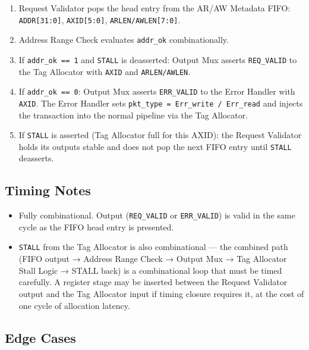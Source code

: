 \begin{enumerate}
  \item Request Validator pops the head entry from the AR/AW Metadata
        FIFO: \texttt{ADDR[31:0]}, \texttt{AXID[5:0]},
        \texttt{ARLEN/AWLEN[7:0]}.
  \item Address Range Check evaluates \texttt{addr\_ok} combinationally.
  \item If \texttt{addr\_ok == 1} and \texttt{STALL} is deasserted:
        Output Mux asserts \texttt{REQ\_VALID} to the Tag Allocator
        with \texttt{AXID} and \texttt{ARLEN/AWLEN}.
  \item If \texttt{addr\_ok == 0}: Output Mux asserts \texttt{ERR\_VALID}
        to the Error Handler with \texttt{AXID}. The Error Handler sets
        \texttt{pkt\_type = Err\_write / Err\_read} and injects the
        transaction into the normal pipeline via the Tag Allocator.
  \item If \texttt{STALL} is asserted (Tag Allocator full for this
        AXID): the Request Validator holds its outputs stable and does
        not pop the next FIFO entry until \texttt{STALL} deasserts.
\end{enumerate}

\subsection{Timing Notes}

\begin{itemize}
  \item Fully combinational. Output (\texttt{REQ\_VALID} or
        \texttt{ERR\_VALID}) is valid in the same cycle as the FIFO
        head entry is presented.
  \item \texttt{STALL} from the Tag Allocator is also combinational —
        the combined path (FIFO output → Address Range Check → Output
        Mux → Tag Allocator Stall Logic → STALL back) is a
        combinational loop that must be timed carefully. A register
        stage may be inserted between the Request Validator output and
        the Tag Allocator input if timing closure requires it, at the
        cost of one cycle of allocation latency.
\end{itemize}

\subsection{Edge Cases}

